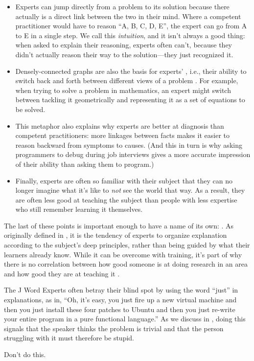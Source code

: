 \begin{itemize}
\item
  Experts can jump directly from a problem to its solution because
  there actually is a direct link between the two in their mind. Where
  a competent practitioner would have to reason ``A, B, C, D, E'', the
  expert can go from A to E in a single step. We call this
  \emph{intuition}, and it isn't always a good thing: when asked to explain
  their reasoning, experts often can't, because they didn't actually
  reason their way to the solution---they just recognized it.
\item
  Densely-connected graphs are also the basis for experts'
  , i.e.,
  their ability to switch back and forth between different views of a
  problem \cite{Petr2016}. For example, when trying to solve a
  problem in mathematics, an expert might switch between tackling it
  geometrically and representing it as a set of equations to be
  solved.
\item
  This metaphor also explains why experts are better at diagnosis than
  competent practitioners: more linkages between facts makes it easier
  to reason backward from symptoms to causes. (And this in turn is why
  asking programmers to debug during job interviews gives a more
  accurate impression of their ability than asking them to program.)
\item
  Finally, experts are often so familiar with their subject that they
  can no longer imagine what it's like to \emph{not} see the world that
  way. As a result, they are often less good at teaching the subject
  than people with less expertise who still remember learning it
  themselves.
\end{itemize}

The last of these points is important enough to have a name of its own:
. As originally
defined in \cite{Nath2003}, it is the tendency of experts to organize
explanation according to the subject's deep principles, rather than
being guided by what their learners already know. While it can be
overcome with training, it's part of why there is no correlation between
how good someone is at doing research in an area and how good they are
at teaching it \cite{Mars2002}.

\begin{aside}{The J Word}
  Experts often betray their blind spot by using the word ``just'' in
  explanations, as in, ``Oh, it's easy, you just fire up a new virtual
  machine and then you just install these four patches to Ubuntu and
  then you just re-write your entire program in a pure functional
  language.'' As we discuss in , doing this
  signals that the speaker thinks the problem is trivial and that the
  person struggling with it must therefore be stupid.

  Don't do this.
\end{aside}

